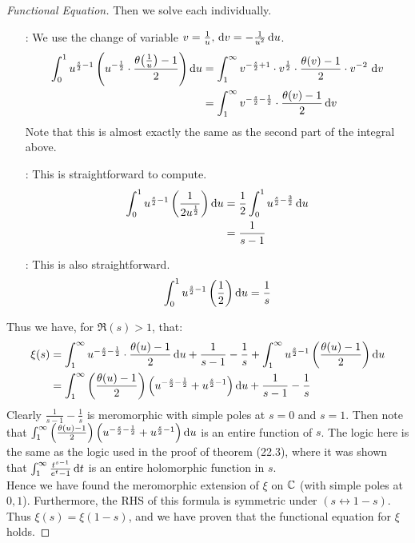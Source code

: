 \begin{proof}[Functional Equation]
Then we solve each individually.
\begin{enumerate}
    \item[\circled{1} :] We use the change of variable $v = \frac{1}{u}, \, \dif v = - \frac{1}{u^2} \dif u$.
    \begin{align*}
        \int_0^1 u^{\frac{s}{2} - 1} \br{u^{- \frac{1}{2}} \cdot \frac{\theta\big(\tfrac{1}{u}\big) - 1}{2}} \dif u &= \int_1^\infty v^{-\frac{s}{2} + 1} \cdot v^{ \frac{1}{2}} \cdot \frac{\theta (v ) - 1}{2} \cdot v^{-2} \, \dif v\\
        &= \int_1^\infty v^{-\frac{s}{2} - \frac{1}{2}} \cdot \frac{\theta (v ) - 1}{2} \dif v
    \end{align*}
    Note that this is almost exactly the same as the second part of the integral above.
    \item[\circled{2} :] This is straightforward to compute.
    \begin{align*}
        \int_0^1 u^{\frac{s}{2} - 1} \br{\frac{1}{2 u^{\frac{1}{2}}}} \dif u &= \frac{1}{2} \int_0^1 u^{\frac{s}{2} - \frac{3}{2}} \dif u\\
        &= \frac{1}{s-1}
    \end{align*}
    \item[\circled{3} :] This is also straightforward.
    \begin{align*}
        \int_0^1 u^{\frac{s}{2} - 1} \br{\frac{1}{2}} \dif u = \frac{1}{s}
    \end{align*}
\end{enumerate}
Thus we have, for $\Re(s) > 1$, that:
\begin{align*}
    \xi(s) &= \int_1^\infty u^{-\frac{s}{2} - \frac{1}{2}} \cdot \frac{\theta (u ) - 1}{2} \dif u + \frac{1}{s-1} - \frac{1}{s} + \int_1^\infty u^{\frac{s}{2} - 1} \br{\frac{\theta(u) - 1}{2}} \dif u\\
    &= \int_1^\infty \br{\frac{\theta(u) - 1}{2}} \br{u^{-\frac{s}{2} - \frac{1}{2}} + u^{\frac{s}{2}-1}  } \dif u +\frac{1}{s-1} - \frac{1}{s}
\end{align*}
Clearly $\frac{1}{s-1} - \frac{1}{s}$ is meromorphic with simple poles at $s=0$ and $s=1$. Then note that $\int_1^\infty \br{\frac{\theta(u) - 1}{2}} \br{u^{-\frac{s}{2} - \frac{1}{2}} + u^{\frac{s}{2} -1  }} \dif u$ is an entire function of $s$. The logic here is the same as the logic used in the proof of theorem (22.3), where it was shown that $\int_1^\infty \frac{t^{s-1}}{e^t - 1} \dif t$ is an entire holomorphic function in $s$.\\

Hence we have found the meromorphic extension of $\xi$ on $\mathbb{C}$ (with simple poles at $0,1$). Furthermore, the RHS of this formula is symmetric under $(s \leftrightarrow 1-s)$. Thus $\xi(s) = \xi(1-s)$, and we have proven that the functional equation for $\xi$ holds.

\end{proof}

